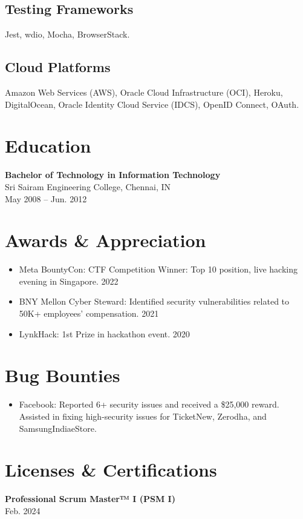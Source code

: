 \documentclass{article}
\begin{document}
\subsection*{Testing Frameworks}
Jest, wdio, Mocha, BrowserStack.

\subsection*{Cloud Platforms}
Amazon Web Services (AWS), Oracle Cloud Infrastructure (OCI), Heroku, DigitalOcean, Oracle Identity Cloud Service (IDCS), OpenID Connect, OAuth.

\section*{Education}
\textbf{Bachelor of Technology in Information Technology} \\
Sri Sairam Engineering College, Chennai, IN \\
May 2008 – Jun. 2012

\section*{Awards \& Appreciation}
\begin{itemize}[noitemsep]
    \item Meta BountyCon: CTF Competition Winner: Top 10 position, live hacking evening in Singapore. 2022
    \item BNY Mellon Cyber Steward: Identified security vulnerabilities related to 50K+ employees’ compensation. 2021
    \item LynkHack: 1st Prize in hackathon event. 2020
\end{itemize}

\section*{Bug Bounties}
\begin{itemize}[noitemsep]
    \item Facebook: Reported 6+ security issues and received a \$25,000 reward. Assisted in fixing high-security issues for TicketNew, Zerodha, and SamsungIndiaeStore.
\end{itemize}

\section*{Licenses \& Certifications}
\textbf{Professional Scrum Master™ I (PSM I)} \\
Feb. 2024
\end{document}
